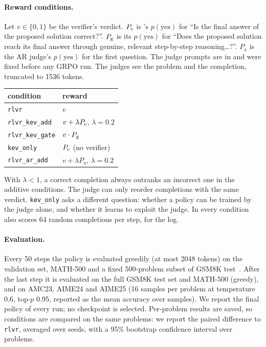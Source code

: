 \paragraph{Reward conditions.} Let $v\in\{0,1\}$ be the verifier's verdict. $P_{\mathrm{c}}$ is \kev{}'s $p(\text{yes})$ for
``Is the final answer of the proposed solution correct?''. $P_{\mathrm{g}}$ is its $p(\text{yes})$ for ``Does the proposed
solution reach its final answer through genuine, relevant step-by-step reasoning\ldots?''. $P_{\mathrm{a}}$ is the AR
judge's $p(\text{yes})$ for the first question. The judge prompts are in
 and were fixed before any GRPO run. The judges see the problem
and the completion, truncated to 1536 tokens.
\begin{center}\small
\begin{tabular}{@{}ll@{}}
\toprule
condition & reward \\ \midrule
\texttt{rlvr} & $v$ \\
\texttt{rlvr\_kev\_add} & $v+\lambda P_{\mathrm{c}}$, $\lambda=0.2$ \\
\texttt{rlvr\_kev\_gate} & $v\cdot P_{\mathrm{g}}$ \\
\texttt{kev\_only} & $P_{\mathrm{c}}$ (no verifier) \\
\texttt{rlvr\_ar\_add} & $v+\lambda P_{\mathrm{a}}$, $\lambda=0.2$ \\ \bottomrule
\end{tabular}
\end{center}
With $\lambda<1$, a correct completion always outranks an incorrect one in the additive conditions. The judge can only
reorder completions with the same verdict. \texttt{kev\_only} asks a different question: whether a policy can be trained
by the judge alone, and whether it learns to exploit the judge. In every condition \kev{} also scores 64 random
completions per step, for the log.

\paragraph{Evaluation.} Every 50 steps the policy is evaluated greedily (at most 2048 tokens) on the validation set,
MATH-500 and a fixed 500-problem subset of GSM8K test~\cite{cobbe2021gsm8k}. After the last step it is evaluated on
the full GSM8K test set and MATH-500 (greedy), and on AMC23, AIME24 and AIME25 (16 samples per problem at temperature
0.6, top-$p$ 0.95, reported as the mean accuracy over samples). We report the final policy of every run; no checkpoint
is selected. Per-problem results are saved, so conditions are compared on the same problems: we report the paired
difference to \texttt{rlvr}, averaged over seeds, with a 95\% bootstrap confidence interval over problems.

